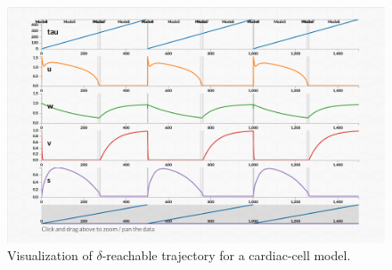 \begin{figure}
  \centering
  \includegraphics[width=\textwidth]{images/cardiac}
  \caption{Visualization of $\delta$-reachable trajectory for
    a cardiac-cell model.}
  \label{fig:viz}
\end{figure}


